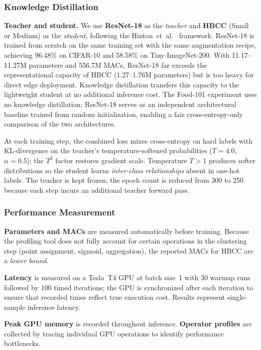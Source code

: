 \documentclass[conference]{IEEEtran}
\begin{document}
\subsubsection{Knowledge Distillation}
\label{ssec:kd_setup}

\noindent\textbf{Teacher and student.}
We use \textbf{ResNet-18} as the \emph{teacher} and \textbf{HBCC}
(Small or Medium) as the \emph{student}, following the
Hinton~et~al.~\cite{Hinton2015Distillation} framework. ResNet-18 is
trained from scratch on the same training set with the same
augmentation recipe, achieving 96.48\% on CIFAR-10 and 58.58\% on
Tiny-ImageNet-200. With 11.17--11.27M parameters and 556.7M MACs,
ResNet-18 far exceeds the representational capacity of HBCC
(1.27--1.76M parameters) but is too heavy for direct edge deployment.
Knowledge distillation transfers this capacity to the lightweight
student at no additional inference cost. The Food-101 experiment uses
no knowledge distillation; ResNet-18 serves as an independent
architectural baseline trained from random initialization, enabling a
fair cross-entropy-only comparison of the two architectures.

At each training step, the combined loss mixes cross-entropy on hard
labels with KL-divergence on the teacher's temperature-softened
probabilities ($T{=}4.0$, $\alpha{=}0.5$); the $T^2$ factor restores
gradient scale. Temperature $T{>}1$ produces softer distributions so
the student learns \emph{inter-class relationships} absent in one-hot
labels. The teacher is kept frozen; the epoch count is reduced from 300
to 250 because each step incurs an additional teacher forward pass.

\subsubsection{Performance Measurement}

\textbf{Parameters and MACs} are measured automatically before
training. Because the profiling tool does not fully account for
certain operations in the clustering step (point assignment, sigmoid,
aggregation), the reported MACs for HBCC are a \emph{lower bound}.

\textbf{Latency} is measured on a Tesla~T4 GPU at batch size~1 with
30 warmup runs followed by 100 timed iterations; the GPU is
synchronized after each iteration to ensure that recorded times
reflect true execution cost. Results represent single-sample
inference latency.

\textbf{Peak GPU memory} is recorded throughout inference.
\textbf{Operator profiles} are collected by tracing individual GPU
operations to identify performance bottlenecks.
\end{document}
